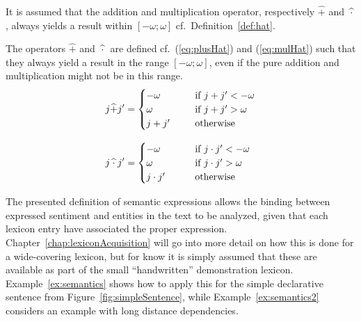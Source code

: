 It is assumed that the addition and multiplication operator, respectively $\widehat{+}$ and $\widehat{\hspace{2.5pt} \cdot \hspace{2.5pt} }$, always yields a result within $[-\omega;\omega]$ cf.\ Definition~\ref{def:hat}.

\begin{definition}
The operators $\widehat{+}$ and $\widehat{\hspace{2.5pt} \cdot \hspace{2.5pt}}$ are defined cf.\ (\ref{eq:plusHat}) and (\ref{eq:mulHat}) such that they always yield a result in the range $[-\omega;\omega]$, even if the pure addition and multiplication might not be in this range.
\begin{align}
    j \widehat{+} j' &= 
\begin{cases}
    -\omega        & \text{if } j + j' < -\omega\\    
    \omega         & \text{if } j + j' > \omega \\
    \makebox[40pt][l]{$j + j'$}         & \text{otherwise}
\end{cases}
\label{eq:plusHat}
\\[.8em]
    j \widehat{\hspace{2.5pt} \cdot \hspace{2.5pt}} j' &= 
\begin{cases}
    -\omega        & \text{if } j \cdot j' < -\omega\\    
    \omega         & \text{if } j \cdot j' > \omega \\
    \makebox[40pt][l]{$j \cdot j'$}         & \text{otherwise}
\end{cases}
\label{eq:mulHat}
\end{align}
\done
\label{def:hat}
\end{definition}
\vspace{-1em}

The presented definition of semantic expressions allows the  binding between expressed sentiment and entities in the text to be analyzed, given that each lexicon entry have associated the proper expression. Chapter~\ref{chap:lexiconAcquisition} will go into more detail on how this is done for a wide-covering lexicon, but for know it is simply assumed that these are available as part of the small ``handwritten'' demonstration lexicon. Example~\ref{ex:semantics} shows how to apply this for the simple declarative sentence from Figure~\ref{fig:simpleSentence}, while Example~\ref{ex:semantics2} considers an example with long distance dependencies.

